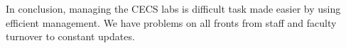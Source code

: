 
In conclusion, managing the CECS labs is difficult task made easier by using efficient management. We have problems on all fronts from staff and faculty turnover to constant updates. 
